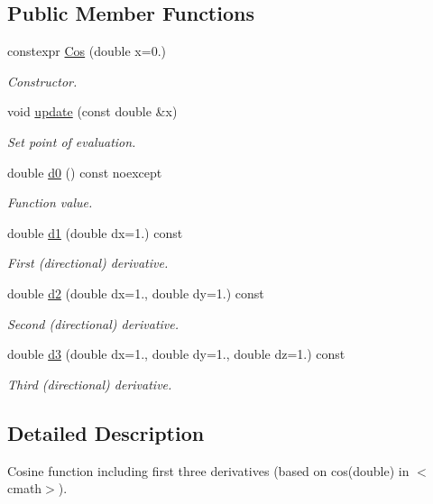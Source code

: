 \subsection*{Public Member Functions}
\begin{DoxyCompactItemize}
\item 
constexpr \hyperlink{structfuncy_1_1Cos_ab342078a9975078f9f4eb230198b7388}{Cos} (double x=0.)
\begin{DoxyCompactList}\small\item\em Constructor. \end{DoxyCompactList}\item 
void \hyperlink{structfuncy_1_1Cos_ab6a6a91571b1ea37e71e95a3cccae39a}{update} (const double \&x)
\begin{DoxyCompactList}\small\item\em Set point of evaluation. \end{DoxyCompactList}\item 
double \hyperlink{structfuncy_1_1Cos_aacd78345b2b8d1792f7038706dff5033}{d0} () const noexcept
\begin{DoxyCompactList}\small\item\em Function value. \end{DoxyCompactList}\item 
double \hyperlink{structfuncy_1_1Cos_a565478a0ae65329d4672f7b0b8446b21}{d1} (double dx=1.) const 
\begin{DoxyCompactList}\small\item\em First (directional) derivative. \end{DoxyCompactList}\item 
double \hyperlink{structfuncy_1_1Cos_a9947718212b92e4ef50a8a4080b9e2f3}{d2} (double dx=1., double dy=1.) const 
\begin{DoxyCompactList}\small\item\em Second (directional) derivative. \end{DoxyCompactList}\item 
double \hyperlink{structfuncy_1_1Cos_a5b67e0b385fe5d6a47f0e19ccd1f4082}{d3} (double dx=1., double dy=1., double dz=1.) const 
\begin{DoxyCompactList}\small\item\em Third (directional) derivative. \end{DoxyCompactList}\end{DoxyCompactItemize}


\subsection{Detailed Description}
Cosine function including first three derivatives (based on cos(double) in $<$cmath$>$). 

